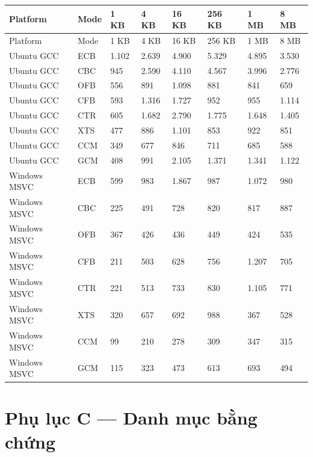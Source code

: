 \documentclass[12pt,a4paper,oneside]{report}
\begin{document}
\begin{longtable}{p{}p{}p{}p{}p{}p{}p{}p{}}
\toprule
Platform & Mode & 1 KB & 4 KB & 16 KB & 256 KB & 1 MB & 8 MB \\
\midrule
\endfirsthead
\toprule
Platform & Mode & 1 KB & 4 KB & 16 KB & 256 KB & 1 MB & 8 MB \\
\midrule
\endhead
Ubuntu GCC & ECB & 1.102 & 2.639 & 4.900 & 5.329 & 4.895 & 3.530 \\
Ubuntu GCC & CBC & 945 & 2.590 & 4.110 & 4.567 & 3.996 & 2.776 \\
Ubuntu GCC & OFB & 556 & 891 & 1.098 & 881 & 841 & 659 \\
Ubuntu GCC & CFB & 593 & 1.316 & 1.727 & 952 & 955 & 1.114 \\
Ubuntu GCC & CTR & 605 & 1.682 & 2.790 & 1.775 & 1.648 & 1.405 \\
Ubuntu GCC & XTS & 477 & 886 & 1.101 & 853 & 922 & 851 \\
Ubuntu GCC & CCM & 349 & 677 & 846 & 711 & 685 & 588 \\
Ubuntu GCC & GCM & 408 & 991 & 2.105 & 1.371 & 1.341 & 1.122 \\
Windows MSVC & ECB & 599 & 983 & 1.867 & 987 & 1.072 & 980 \\
Windows MSVC & CBC & 225 & 491 & 728 & 820 & 817 & 887 \\
Windows MSVC & OFB & 367 & 426 & 436 & 449 & 424 & 535 \\
Windows MSVC & CFB & 211 & 503 & 628 & 756 & 1.207 & 705 \\
Windows MSVC & CTR & 221 & 513 & 733 & 830 & 1.105 & 771 \\
Windows MSVC & XTS & 320 & 657 & 692 & 988 & 367 & 528 \\
Windows MSVC & CCM & 99 & 210 & 278 & 309 & 347 & 315 \\
Windows MSVC & GCM & 115 & 323 & 473 & 613 & 693 & 494 \\
\bottomrule
\end{longtable}


\section{Phụ lục C — Danh mục bằng chứng}
\end{document}
